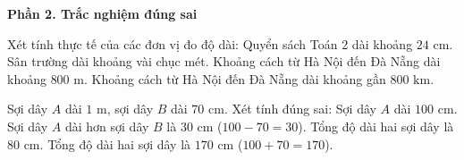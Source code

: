 \textbf{Phần 2. Trắc nghiệm đúng sai}

\begin{ex} %
Xét tính thực tế của các đơn vị đo độ dài:
\choiceTF
{\True Quyển sách Toán 2 dài khoảng $24\text{ cm}$.}
{\True Sân trường dài khoảng vài chục mét.}
{Khoảng cách từ Hà Nội đến Đà Nẵng dài khoảng $800\text{ m}$.}
{\True Khoảng cách từ Hà Nội đến Đà Nẵng dài khoảng gần $800\text{ km}$.}
\end{ex}

\begin{ex} %
Sợi dây $A$ dài $1\text{ m}$, sợi dây $B$ dài $70\text{ cm}$. Xét tính đúng sai:
\choiceTF
{\True Sợi dây $A$ dài $100\text{ cm}$.}
{\True Sợi dây $A$ dài hơn sợi dây $B$ là $30\text{ cm}$ ($100 - 70 = 30$).}
{Tổng độ dài hai sợi dây là $80\text{ cm}$.}
{\True Tổng độ dài hai sợi dây là $170\text{ cm}$ ($100 + 70 = 170$).}
\end{ex}

